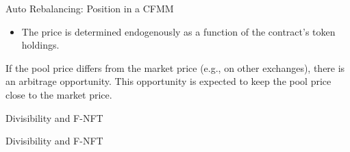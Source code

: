 \documentclass[handout]{beamer}
\begin{document}
\begin{frame}{Auto Rebalancing: Position in a CFMM}

	\begin{figure}	
		\centering
		
	\end{figure}

	\begin{itemize}
		\item<5-> The price is determined endogenously as a function of the contract's token holdings.
	\end{itemize}
	
	\vspace{1em}
	
	If the pool price differs from the market price (e.g., on other exchanges), there is an arbitrage opportunity. This opportunity is expected to keep the pool price close to the market price.


\end{frame}
	



\begin{frame}{Divisibility and F-NFT}

	
	\vspace{2em}
	\begin{tikzpicture}
		
	\end{tikzpicture}	

\end{frame}

\begin{frame}{Divisibility and F-NFT}

	
	\vspace{2em}
	\begin{tikzpicture}
		
	\end{tikzpicture}	

\end{frame}
\end{document}
